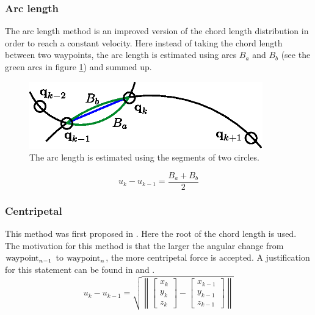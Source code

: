\subsubsection{Arc length}
The arc length method is an improved version of the chord length distribution in order to reach a constant velocity. Here instead of taking the chord length between two waypoints, the arc length is estimated using arcs $B_a$ and $B_b$ (see the green arcs in figure \ref{fig:arcLength}) and summed up. %


\begin{figure}[H]
	\centering
    \includegraphics[width = 0.9\textwidth]{graphics/arcLength.eps}
  \caption{The arc length is estimated using the segments of two circles.}
  \label{fig:arcLength}
\end{figure}


\begin{equation*}
u_k-u_{k-1}=\frac{B_a+B_b}{2}
\end{equation*}

\subsubsection{Centripetal}
This method was first proposed in \cite{lee}. Here the root of the chord length is used. The motivation for this method is that the larger the angular change from $\textnormal{waypoint}_{n-1}$ to $\textnormal{waypoint}_n$, the more centripetal force is accepted. A justification for this statement can be found in \cite{doessegger} and \cite{lee}.
\begin{equation*}
u_k-u_{k-1}=\sqrt{\left \| \begin{bmatrix}x_k\\y_k\\z_k \end{bmatrix}-\begin{bmatrix}x_{k-1}\\y_{k-1}\\z_{k-1} \end{bmatrix}\right \|}
\end{equation*}

